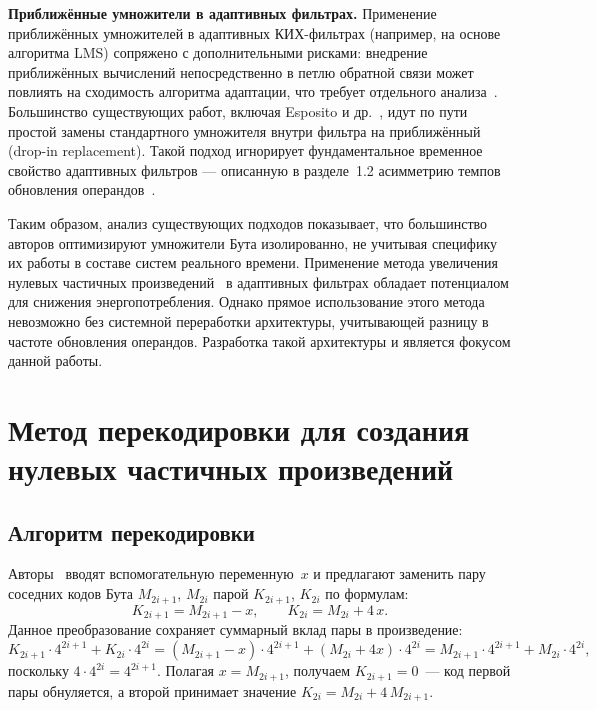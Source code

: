\documentclass[a4paper, 12pt, oneside]{report}
\begin{document}
\textbf{Приближённые умножители в адаптивных фильтрах.} Применение
приближённых умножителей в адаптивных КИХ-фильтрах (например, на
основе алгоритма LMS) сопряжено с дополнительными рисками: внедрение
приближённых вычислений непосредственно в петлю обратной связи может
повлиять на сходимость алгоритма адаптации, что требует отдельного
анализа~\cite{esposito2018}. Большинство существующих работ, включая
Esposito и др.~\cite{esposito2018}, идут по пути простой замены
стандартного умножителя внутри фильтра на приближённый (drop-in
replacement). Такой подход игнорирует фундаментальное временное
свойство адаптивных фильтров — описанную в разделе~1.2 асимметрию
темпов обновления операндов~\cite{mohantypatel2015}.

Таким образом, анализ существующих подходов показывает, что
большинство авторов оптимизируют умножители Бута изолированно, не
учитывая специфику их работы в составе систем реального времени.
Применение метода увеличения нулевых частичных
произведений~\cite{zhu2025} в адаптивных фильтрах обладает
потенциалом для снижения энергопотребления. Однако прямое
использование этого метода невозможно без системной переработки
архитектуры, учитывающей разницу в частоте обновления операндов.
Разработка такой архитектуры и является фокусом данной работы.

\chapter{Метод перекодировки для создания нулевых частичных произведений}

\section{Алгоритм перекодировки}

Авторы~\cite{zhu2025} вводят вспомогательную переменную~$x$ и предлагают
заменить пару соседних кодов Бута $M_{2i+1}$, $M_{2i}$ парой
$K_{2i+1}$, $K_{2i}$ по формулам:
\begin{equation}
  K_{2i+1} = M_{2i+1} - x,
  \qquad
  K_{2i}   = M_{2i} + 4\,x.
  \label{eq:recoding}
\end{equation}
Данное преобразование сохраняет суммарный вклад пары в произведение:
\[
  K_{2i+1}\cdot 4^{2i+1} + K_{2i}\cdot 4^{2i}
  = (M_{2i+1} - x)\cdot 4^{2i+1} + (M_{2i} + 4x)\cdot 4^{2i}
  = M_{2i+1}\cdot 4^{2i+1} + M_{2i}\cdot 4^{2i},
\]
поскольку $4\cdot 4^{2i} = 4^{2i+1}$.
Полагая $x = M_{2i+1}$, получаем $K_{2i+1} = 0$~---
код первой пары обнуляется, а второй принимает значение
$K_{2i} = M_{2i} + 4\,M_{2i+1}$.
\end{document}
